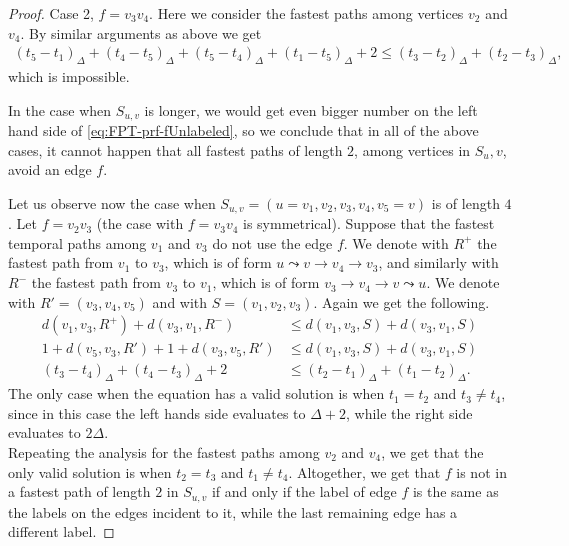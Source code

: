 \documentclass[11pt,a4paper]{article}
\theoremstyle{remark}
\theoremstyle{definition}
\begin{document}
\begin{proof}
    Case 2,  $f = v_3v_4$.
    Here we consider the fastest paths among vertices $v_{2}$ and $v_{4}$.
    By similar arguments as above we get
    \begin{align*}
        (t_5 - t_1)_\Delta + (t_4 - t_5)_\Delta + (t_5 - t_4)_\Delta + (t_1 - t_5)_\Delta + 2 \leq (t_3 - t_2)_\Delta + (t_2 - t_3)_\Delta,
    \end{align*}
    which is impossible.
    
    In the case when $S_{u,v}$ is longer, we would get even bigger number on the left hand side of \cref{eq:FPT-prf-fUnlabeled}, 
    so we conclude that in all of the above cases, it cannot happen that all fastest paths of length $2$, among vertices in $S{_u,v}$, avoid an edge $f$.

    Let us observe now the case when $S_{u,v} = (u=v_1,v_2, v_3, v_4, v_5=v)$ is of length $4$.
    Let $f = v_2 v_3$ (the case with $f = v_3 v_4$ is symmetrical).
    Suppose that the fastest temporal paths among $v_1$ and $v_3$ do not use the edge $f$.
    We denote with $R^+$ the fastest path from $v_1$ to $v_3$, 
    which is of form $u \leadsto v \rightarrow v_4 \rightarrow v_3$,
    and similarly 
    with $R^-$ the fastest path from $v_3$ to $v_1$, which is
    of form $v_3 \rightarrow v_4 \rightarrow v \leadsto u$.
    We denote with $R' = (v_3, v_4, v_5)$ and with $S = (v_1,v_2,v_3)$.
    Again we get the following.
    \begin{equation}
    \begin{split}
        d(v_{1}, v_{3}, R^+) + d(v_{3}, v_{1}, R^-) &\leq 
        d(v_{1}, v_{3}, S) + d(v_{3}, v_{1}, S) \\
        1 + d(v_5,v_3,R') + 1 + d(v_3,v_5,R') &\leq d(v_{1}, v_{3}, S) + d(v_{3}, v_{1}, S) \\
        (t_3 - t_4)_\Delta + (t_4 - t_3)_\Delta + 2 
        &\leq 
        (t_2 - t_1)_\Delta + (t_1 - t_2)_\Delta.        
    \end{split}
    \end{equation}
    The only case when the equation has a valid solution is when $t_1 = t_2$ and $t_3 \neq t_4$,
    since in this case the left hands side evaluates to $\Delta + 2$, while the right side evaluates to $2 \Delta$.\\
    Repeating the analysis for the fastest paths among $v_2$ and $v_4$,
    we get that the only valid solution is when $t_2 = t_3$ and $t_1 \neq t_4$.
    Altogether, we get that $f$ is not in a fastest path of length $2$ in $S_{u,v}$ if and only if the label of edge $f$ is the same as the labels on the edges incident to it, while the last remaining edge has a different label.
\end{proof}
\end{document}
